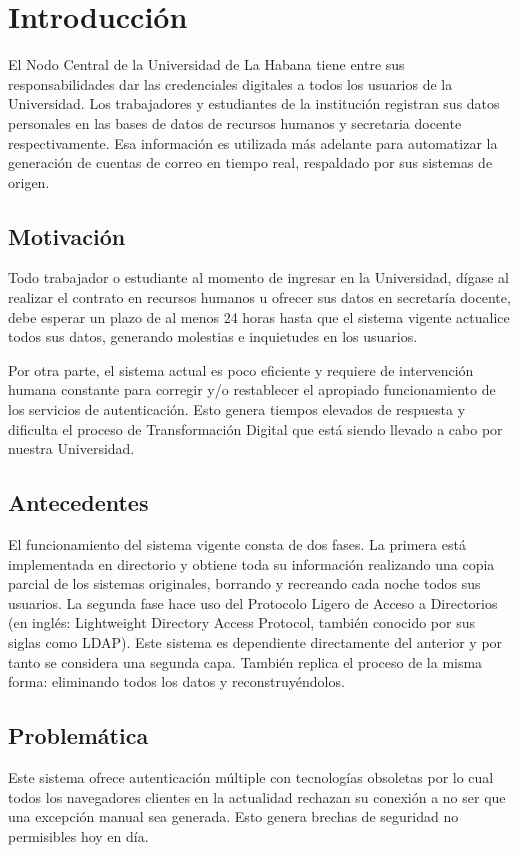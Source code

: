 \chapter*{Introducción}\label{chapter:introduction}
El Nodo Central de la Universidad de La Habana tiene entre sus responsabilidades dar  las credenciales  digitales a todos los usuarios de la Universidad. Los trabajadores y estudiantes de la instituci\'on registran sus datos personales en las bases de datos de recursos humanos y secretaria docente respectivamente. Esa informaci\'on  es utilizada m\'as adelante para automatizar la generación de cuentas de correo en tiempo real, respaldado por sus sistemas de origen.


\section*{Motivación}
Todo trabajador o estudiante al momento de ingresar en la Universidad, dígase al realizar el contrato en recursos humanos u ofrecer sus datos en secretaría docente, debe esperar un plazo de al menos 24 horas hasta que el sistema vigente actualice todos sus datos, generando molestias e inquietudes en los usuarios.

Por otra parte, el sistema actual es poco eficiente y requiere de intervención humana constante para corregir y/o restablecer el apropiado funcionamiento de los servicios de autenticación. Esto genera tiempos elevados de respuesta y dificulta el proceso de Transformación Digital que está siendo llevado a cabo por nuestra Universidad.

\section*{Antecedentes}
El funcionamiento del sistema vigente consta de dos fases. La primera está implementada en directorio y obtiene toda su información realizando una copia parcial de los sistemas originales, borrando y recreando cada noche todos sus usuarios. La segunda fase hace uso del Protocolo Ligero de Acceso a Directorios (en inglés: Lightweight Directory Access Protocol, también conocido por sus siglas como LDAP). Este sistema es dependiente directamente del anterior y por tanto se considera una segunda capa. También replica el proceso de la misma forma: eliminando todos los datos y reconstruyéndolos. 
\section*{Problemática}
 Este sistema ofrece autenticación múltiple con tecnologías obsoletas por lo cual todos los navegadores clientes en la actualidad rechazan su conexión a no ser que una excepción manual sea generada. Esto genera brechas de seguridad no permisibles hoy en día.

